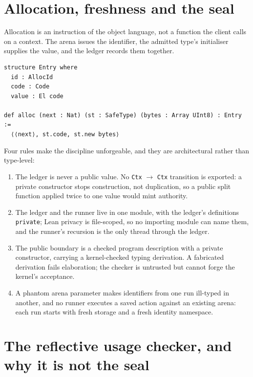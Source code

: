 \documentclass[10pt,a4paper]{article}
\begin{document}
\section{Allocation, freshness and the seal}\label{sec:seal}

Allocation is an instruction of the object language, not a function the client
calls on a context. The arena issues the identifier, the admitted type's
initialiser supplies the value, and the ledger records them together.

\begin{lstlisting}[caption={Allocation sketch. \texttt{next} is the arena's fresh counter; no client-supplied id appears.}]
structure Entry where
  id : AllocId
  code : Code
  value : El code

def alloc (next : Nat) (st : SafeType) (bytes : Array UInt8) : Entry :=
  ⟨⟨next⟩, st.code, st.new bytes⟩
\end{lstlisting}

Four rules make the discipline unforgeable, and they are architectural rather
than type-level:

\begin{enumerate}[itemsep=2pt,topsep=2pt]
\item The ledger is never a public value. No \texttt{Ctx} $\to$ \texttt{Ctx} transition is
exported: a private constructor stops construction, not duplication, so a public
split function applied twice to one value would mint authority.
\item The ledger and the runner live in one module, with the ledger's definitions
\texttt{private}; Lean privacy is file-scoped, so no importing module can name
them, and the runner's recursion is the only thread through the ledger.
\item The public boundary is a checked program description with a private
constructor, carrying a kernel-checked typing derivation. A fabricated derivation
fails elaboration; the checker is untrusted but cannot forge the kernel's
acceptance.
\item A phantom arena parameter makes identifiers from one run ill-typed in
another, and no runner executes a saved action against an existing arena: each
run starts with fresh storage and a fresh identity namespace.
\end{enumerate}

\section{The reflective usage checker, and why it is not the seal}
\end{document}
